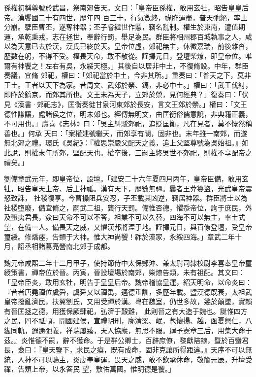 \begin{pinyinscope}
 孫權初稱尊號於武昌，祭南郊告天。文曰：「皇帝臣孫權，敢用玄牡，昭告皇皇后帝。漢饗國二十有四世，歷年四
 百三十，行氣數終，祿胙運盡，普天弛絕，率土分崩。孽臣曹丕，遂奪神器；丕子睿繼世作慝，竊名亂制。權生於東南，遭值期運，承乾秉戎，志在拯世，奉辭行罰，舉足為民。群臣將相州郡百城執事之人，咸以為天意已去於漢，漢氏已終於天。皇帝位虛，郊祀無主，休徵嘉瑞，前後雜沓，歷數在躬，不得不受。權畏天命，敢不敬從。謹擇元日，登壇柴燎，即皇帝位。唯爾有神饗之！左右有吳，永綏天極。」其後自以居非中土，不復脩設。中年，群臣奏議，宜脩
 郊祀，權曰：「郊祀當於中土，今非其所。」重奏曰：「普天之下，莫非王土。王者以天下為家。昔周文、武郊於禜、鎬，非必中土。」權曰：「武王伐紂，即阼於鎬京，而郊其所也。文王未為天子，立郊於禜，見何經典？」復奏曰：「伏見《漢書·郊祀志》，匡衡奏徙甘泉河東郊於長安，言文王郊於禜。」權曰：「文王德性謙讓，處諸侯之位，明未郊也。經傳無明文，由匡衡俗儒意說，非典籍正義，不可用也。」虞喜《志林》曰：「吳主糾駁郊祀，追貶匡衡，凡在見者，莫不慨然稱善也。」何承
 天曰：「案權建號繼天，而郊享有闕，固非也。末年雖一南郊，而遂無北郊之禮。環氏《吳紀》：『權思崇嚴父配天之義，追上父堅尊號為吳始祖。』如此說，則權末年所郊，堅配天也。權卒後，三嗣主終吳世不郊祀，則權不享配帝之禮矣。」



 劉備章武元年，即皇帝位，設壇。「建安二十六年夏四月丙午，皇帝臣備，敢用玄牡，昭告皇天上帝、后土神祗。漢有天下，歷數無疆。曩者王莽篡盜，光武皇帝震怒致誅，
 社稷復享。今曹操阻兵安忍，子丕載其凶逆，竊居神器。群臣將士以為社稷墮廢，備宜脩之，嗣武二祖，龔行天罰。備惟否德，懼忝帝位，詢于庶民，外及蠻夷君長，僉曰天命不可以不答，祖業不可以久替，四海不可以無主，率土式望，在備一人。備畏天之威，又懼漢邦將湮于地。謹擇元日，與百僚登壇，受皇帝璽綬。修燔瘞，告類于大神。惟大神尚饗！祚於漢家，永綏四海。」章武二年十月，詔丞相諸葛亮營南北郊于成都。



 魏元帝咸熙二年十二月甲子，使持節侍中太保鄭沖、兼太尉司隸校尉李喜奉皇帝璽綬策書，禪帝位於晉。丙寅，晉設壇場於南郊，柴燎告類，未有祖配。其文曰：「皇帝臣炎，敢用玄牡，明告于皇皇后帝。魏帝稽協皇運，紹天明命，以命炎曰：『昔者唐堯禪位虞舜，虞舜又以禪禹，邁德垂訓，多歷年載。暨漢德既衰，太祖武皇帝撥亂濟民，扶翼劉氏，又用受禪於漢。粵在魏室，仍世多故，幾於顛墜，實賴有晉匡拯之德，用獲保厥肆祀，弘濟于艱難，
 此則晉之有大造于魏也。誕惟四方之民，罔不祗順，開國建侯，宣禮明刑，廓清梁、岷，苞懷揚、越，函夏興仁，八紘同軌，遐邇弛義，祥瑞屢臻，天人協應，無思不服。肆予憲章三后，用集大命于茲。』炎惟德不嗣，辭不獲命。于是群公卿士，百辟庶僚，黎獻陪隸，暨於百蠻君長，僉曰：『皇天鑒下，求民之瘼，既有成命，固非克讓所得距違。』天序不可以無統，人神不可以曠主，炎虔奉皇運，畏天之威，敢不欽承休命，敬簡元辰，升壇受禪，告類上帝，以永答民
 望，敷佑萬國。惟明德是饗。」




\end{pinyinscope}
